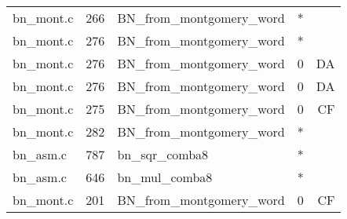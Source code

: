\begin{table}[h!]
\begin{tabular}{lrlrr}
bn\_mont.c& 266&BN\_from\_montgomery\_word&*&\\
bn\_mont.c& 276&BN\_from\_montgomery\_word&*&\\
bn\_mont.c& 276&BN\_from\_montgomery\_word&0 &DA\\
bn\_mont.c& 276&BN\_from\_montgomery\_word&0 &DA\\
bn\_mont.c& 275&BN\_from\_montgomery\_word&0 &CF\\
bn\_mont.c& 282&BN\_from\_montgomery\_word&*&\\
bn\_asm.c& 787&bn\_sqr\_comba8&*&\\
bn\_asm.c& 646&bn\_mul\_comba8&*&\\
bn\_mont.c& 201&BN\_from\_montgomery\_word&0 &CF\\
\hline
\end{tabular}
\renewcommand{\baselinestretch}{1.0}\selectfont
\end{table}
